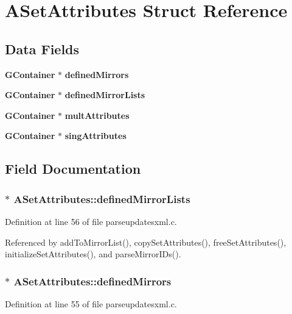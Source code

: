 \section{ASet\-Attributes Struct Reference}
\label{structASetAttributes}
\subsection*{Data Fields}
\begin{CompactItemize}
\item 
{\bf GContainer} $\ast$ {\bf defined\-Mirrors}
\item 
{\bf GContainer} $\ast$ {\bf defined\-Mirror\-Lists}
\item 
{\bf GContainer} $\ast$ {\bf mult\-Attributes}
\item 
{\bf GContainer} $\ast$ {\bf sing\-Attributes}
\end{CompactItemize}


\subsection{Field Documentation}
\subsubsection{$\ast$ {\bf ASet\-Attributes::defined\-Mirror\-Lists}}\label{structASetAttributes_o1}




Definition at line 56 of file parseupdatesxml.c.

Referenced by add\-To\-Mirror\-List(), copy\-Set\-Attributes(), free\-Set\-Attributes(), initialize\-Set\-Attributes(), and parse\-Mirror\-IDs().
\subsubsection{$\ast$ {\bf ASet\-Attributes::defined\-Mirrors}}\label{structASetAttributes_o0}




Definition at line 55 of file parseupdatesxml.c.

